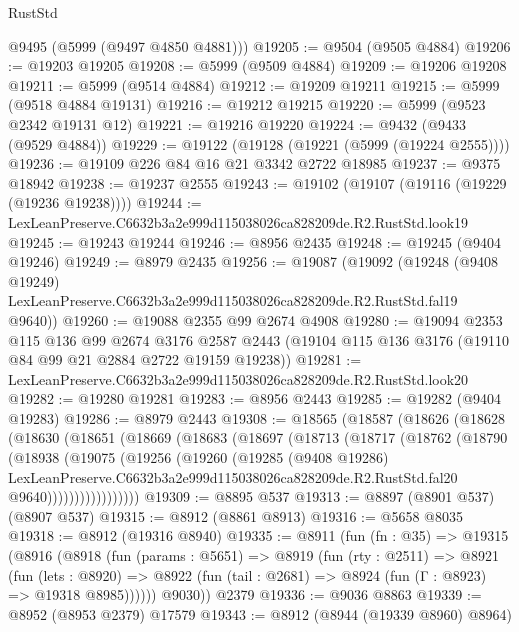 \begin{lexlean}{RustStd}
\begin{coremodule}
      @9495
      (@5999 (@9497 @4850 @4881)))
@19205 := @9504 (@9505 @4884)
@19206 := @19203 @19205
@19208 := @5999 (@9509 @4884)
@19209 := @19206 @19208
@19211 := @5999 (@9514 @4884)
@19212 := @19209 @19211
@19215 := @5999 (@9518 @4884 @19131)
@19216 := @19212 @19215
@19220 := @5999 (@9523 @2342 @19131 @12)
@19221 := @19216 @19220
@19224 := @9432 (@9433 (@9529 @4884))
@19229 := @19122 (@19128 (@19221 (@5999 (@19224 @2555))))
@19236 := @19109 @226 @84 @16 @21 @3342 @2722 @18985
@19237 := @9375 @18942
@19238 := @19237 @2555
@19243 := @19102 (@19107 (@19116 (@19229 (@19236 @19238))))
@19244 := LexLeanPreserve.C6632b3a2e999d115038026ca828209de.R2.RustStd.look19
@19245 := @19243 @19244
@19246 := @8956 @2435
@19248 := @19245 (@9404 @19246)
@19249 := @8979 @2435
@19256 := @19087
    (@19092
      (@19248
        (@9408 @19249)
        LexLeanPreserve.C6632b3a2e999d115038026ca828209de.R2.RustStd.fal19
        @9640))
@19260 := @19088 @2355 @99 @2674 @4908
@19280 := @19094
    @2353
    @115
    @136
    @99
    @2674
    @3176
    @2587
    @2443
    (@19104 @115 @136 @3176 (@19110 @84 @99 @21 @2884 @2722 @19159 @19238))
@19281 := LexLeanPreserve.C6632b3a2e999d115038026ca828209de.R2.RustStd.look20
@19282 := @19280 @19281
@19283 := @8956 @2443
@19285 := @19282 (@9404 @19283)
@19286 := @8979 @2443
@19308 := @18565
    (@18587
      (@18626
        (@18628
          (@18630
            (@18651
              (@18669
                (@18683
                  (@18697
                    (@18713
                      (@18717
                        (@18762
                          (@18790
                            (@18938
                              (@19075
                                (@19256
                                  (@19260
                                    (@19285
                                      (@9408 @19286)
                                      LexLeanPreserve.C6632b3a2e999d115038026ca828209de.R2.RustStd.fal20
                                      @9640)))))))))))))))))
@19309 := @8895 @537
@19313 := @8897 (@8901 @537) (@8907 @537)
@19315 := @8912 (@8861 @8913)
@19316 := @5658 @8035
@19318 := @8912 (@19316 @8940)
@19335 := @8911
    (fun (fn : @35) =>
    @19315
      (@8916
        (@8918
          (fun (params : @5651) =>
          @8919
            (fun (rty : @2511) =>
            @8921
              (fun (lets : @8920) =>
              @8922 (fun (tail : @2681) => @8924 (fun (Γ : @8923) => @19318 @8985))))))
        @9030))
    @2379
@19336 := @9036 @8863
@19339 := @8952 (@8953 @2379) @17579
@19343 := @8912 (@8944 (@19339 @8960) @8964)

\end{coremodule}
\end{lexlean}
